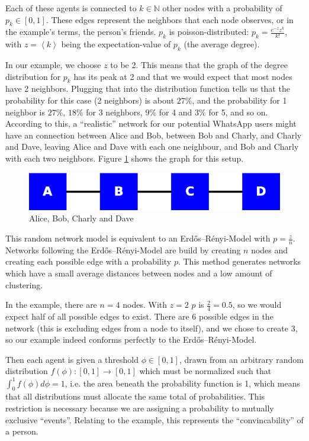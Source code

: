 \documentclass{sig-alternate-05-2015}
\begin{document}
Each of these agents is connected to $k \in \mathbb{N}$ other nodes with a probability of $p_k \in [0,1]$. These edges represent the neighbors that each node observes, or in the example's terms, the person's friends. $p_k$ is poisson-distributed: $p_k = \frac{e^{-z}z^k}{k!}$, with $z = \left<k\right>$ being the expectation-value of $p_k$ (the average degree).

In our example, we choose $z$ to be 2. This means that the graph of the degree distribution for $p_k$ has its peak at 2 and that we would expect that most nodes have 2 neighbors. Plugging that into the distribution function tells us that the probability for this case (2 neighbors) is about $27\%$, and the probability for 1 neighbor is $27\%$, $18\%$ for 3 neighbors, $9\%$ for 4 and $3\%$ for 5, and so on. According to this, a ``realistic'' network for our potential WhatsApp users might have an connection between Alice and Bob, between Bob and Charly, and Charly and Dave, leaving Alice and Dave with each one neighbour, and Bob and Charly with each two neighbors. Figure \ref{fig:abcd} shows the graph for this setup.

\begin{figure}[h!]
    \includegraphics[width=\columnwidth]{img/abcd}
    \centering
    \caption{Alice, Bob, Charly and Dave}
    \label{fig:abcd}
\end{figure}

This random network model is equivalent to an Erdős–Rényi-Model with $p = \frac{z}{n}$. Networks following the Erdős–Rényi-Model are build by creating $n$ nodes and creating each possible edge with a probability $p$. This method generates networks which have a small average distances between nodes and a low amount of clustering.

In the example, there are $n = 4$ nodes. With $z = 2$ $p$ is $\frac{2}{4} = 0.5$, so we would expect half of all possible edges to exist. There are 6 possible edges in the network (this is excluding edges from a node to itself), and we chose to create 3, so our example indeed conforms perfectly to the Erdős–Rényi-Model.

Then each agent is given a threshold $\phi \in [0,1]$, drawn from an arbitrary random distribution $f(\phi): [0,1] \rightarrow [0,1]$ which must be normalized such that $\int_0^1 f(\phi) d\phi = 1$, i.e. the area beneath the probability function is 1, which means that all distributions must allocate the same total of probabilities. This restriction is necessary because we are assigning a probability to mutually exclusive ``events''. Relating to the example, this represents the ``convincability'' of a person.
\end{document}
